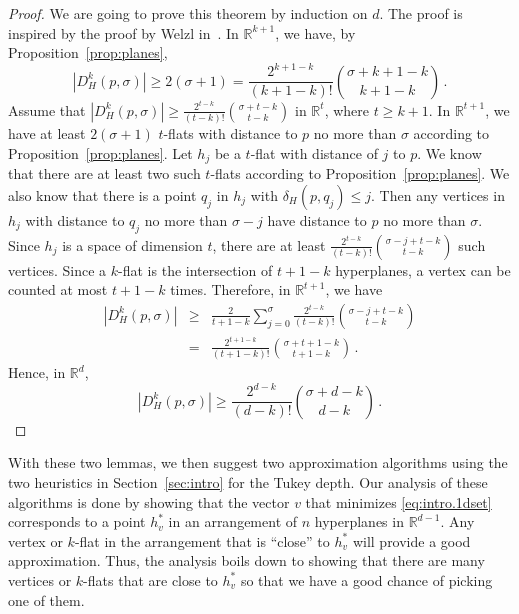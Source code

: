 \documentclass[preprint, 12pt]{elsarticle}
\begin{document}
\begin{proof}%
  We are going to prove this theorem by induction on $d$. The proof is inspired by the proof by Welzl in~\cite{welzl92}. In $\mathbb{R}^{k+1}$, we have, by Proposition~\ref{prop:planes},
  \begin{equation}
    |D_{H}^{k}(p,\sigma)| \geq 2(\sigma+1) = \frac{2^{k+1-k}}{(k+1-k)!}\binom{\sigma + k+1-k}{k+1-k} \, . \nonumber
  \end{equation}
  Assume that $|D_{H}^{k}(p,\sigma)| \geq \frac{2^{t-k}}{(t-k)!}\binom{\sigma + t-k}{t-k}$ in $\mathbb{R}^{t}$, where $t \geq k + 1$. In $\mathbb{R}^{t+1}$, we have at least $2(\sigma+1)$ $t$-flats with distance to $p$ no more than $\sigma$ according to Proposition~\ref{prop:planes}. Let $h_{j}$ be a $t$-flat with distance of $j$ to $p$. We know that there are at least two such $t$-flats according to Proposition~\ref{prop:planes}. We also know that there is a point $q_{j}$ in $h_{j}$ with $\delta_{H}(p,q_{j}) \leq j$. Then any vertices in $h_{j}$ with distance to $q_{j}$ no more than $\sigma - j$ have distance to $p$ no more than $\sigma$. Since $h_{j}$ is a space of dimension $t$, there are at least $\frac{2^{t-k}}{(t-k)!}\binom{\sigma - j + t-k}{t-k}$ such vertices. Since a $k$-flat is the intersection of $t+1-k$ hyperplanes, a vertex can be counted at most $t+1-k$ times. Therefore, in $\mathbb{R}^{t+1}$, we have
  \begin{eqnarray}
    |D_{H}^{k}(p,\sigma)| & \geq & \frac{2}{t+1-k}\sum_{j=0}^{\sigma}\frac{2^{t-k}}{(t-k)!}\binom{\sigma - j + t-k}{t-k} \nonumber \\
    & = & \frac{2^{t+1-k}}{(t+1-k)!}\binom{\sigma + t + 1 - k}{t+1-k} \, . \nonumber
  \end{eqnarray}
  Hence, in $\mathbb{R}^{d}$,
  \begin{equation}
    |D_{H}^{k}(p,\sigma)| \geq \frac{2^{d-k}}{(d-k)!}\binom{\sigma + d-k}{d-k} \, . \nonumber
  \end{equation}
\end{proof}

With these two lemmas, we then suggest two approximation algorithms using the two heuristics in Section~\ref{sec:intro} for the Tukey depth. Our analysis of these algorithms is done by showing that the vector $v$ that minimizes \eqref{eq:intro.1dset} corresponds to a point $h_{v}^{*}$ in an arrangement of $n$ hyperplanes in $\mathbb{R}^{d-1}$. Any vertex or $k$-flat in the arrangement that is ``close'' to $h_{v}^{*}$ will provide a good approximation. Thus, the analysis boils down to showing that there are many vertices or $k$-flats that are close to $h_{v}^{*}$ so that we have a good chance of picking one of them.
\end{document}
